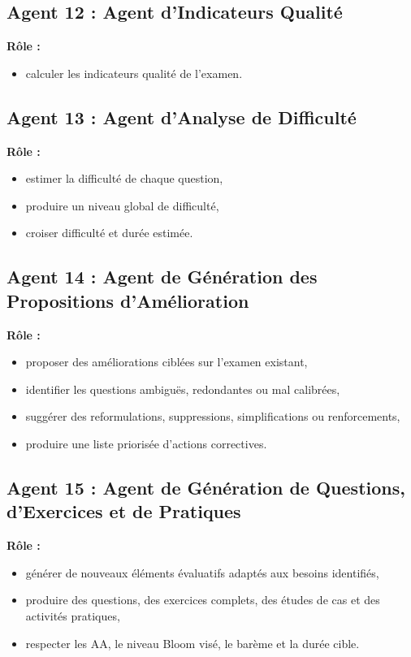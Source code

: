 \documentclass[12pt,a4paper]{article}
\begin{document}
\subsection*{Agent 12 : Agent d’Indicateurs Qualité}

\textbf{Rôle :}
\begin{itemize}[leftmargin=1cm]
    \item calculer les indicateurs qualité de l’examen.
\end{itemize}

\subsection*{Agent 13 : Agent d’Analyse de Difficulté}

\textbf{Rôle :}
\begin{itemize}[leftmargin=1cm]
    \item estimer la difficulté de chaque question,
    \item produire un niveau global de difficulté,
    \item croiser difficulté et durée estimée.
\end{itemize}

\subsection*{Agent 14 : Agent de Génération des Propositions d’Amélioration}

\textbf{Rôle :}
\begin{itemize}[leftmargin=1cm]
    \item proposer des améliorations ciblées sur l’examen existant,
    \item identifier les questions ambiguës, redondantes ou mal calibrées,
    \item suggérer des reformulations, suppressions, simplifications ou renforcements,
    \item produire une liste priorisée d’actions correctives.
\end{itemize}

\subsection*{Agent 15 : Agent de Génération de Questions, d’Exercices et de Pratiques}

\textbf{Rôle :}
\begin{itemize}[leftmargin=1cm]
    \item générer de nouveaux éléments évaluatifs adaptés aux besoins identifiés,
    \item produire des questions, des exercices complets, des études de cas et des activités pratiques,
    \item respecter les AA, le niveau Bloom visé, le barème et la durée cible.
\end{itemize}
\end{document}
